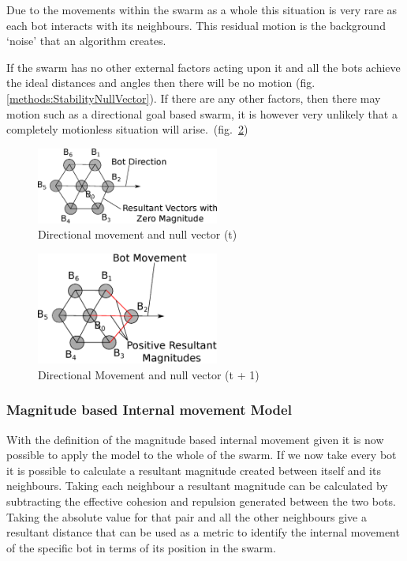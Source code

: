 \documentclass[10pt,journal,letterpaper,twoside]{IEEEtran}
\newcommand{\stability}{internal movement}
\newcommand{\Stability}{Internal movement}
\newcommand{\Fig}{fig.}
\begin{document}
Due to the movements within the swarm as a whole this situation is
very rare as each bot interacts with its neighbours. This residual
motion is the background `noise' that an algorithm creates.

If the swarm has no other external factors acting upon it and all the
bots achieve the ideal distances and angles then there will be no
motion (\Fig{} \ref{methods:StabilityNullVector}). If there are any
other factors, then there may motion such as a directional goal based
swarm, it is however very unlikely that a completely motionless
situation will arise.~(\Fig{}~\ref{methods:StabilityNullVector2})

\begin{figure}[H]
\begin{center}
\includegraphics[width=6cm]{figures/StabilityNullVector3}
\end{center}
\caption{Directional movement and null vector (t)} \label{methods:StabilityNullVector3}
\end{figure}

\begin{figure}[H]
\begin{center}
\includegraphics[width=6cm]{figures/StabilityNullVector2}
\end{center}
\caption{Directional Movement and null vector (t + 1)} \label{methods:StabilityNullVector2}
\end{figure}

\subsubsection{Magnitude based \Stability{} Model}\label{Section:StabilityModel}

With the definition of the magnitude based \stability{} given it is
now possible to apply the model to the whole of the swarm. If we now
take every bot it is possible to calculate a resultant magnitude
created between itself and its neighbours. Taking each neighbour a
resultant magnitude can be calculated by subtracting the effective
cohesion and repulsion generated between the two bots. Taking the
absolute value for that pair and all the other neighbours give a
resultant distance that can be used as a metric to identify the
\stability{} of the specific bot in terms of its position in the
swarm.
\end{document}
